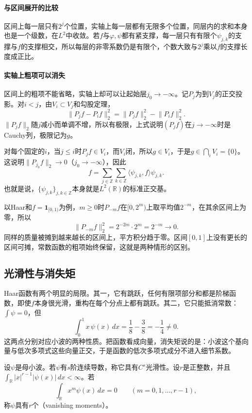 \paragraph{与区间展开的比较}
区间上每一层只有$2^j$个位置，实轴上每一层都有无限多个位置，同层内的求和本身也是一个级数，在$L^2$中收敛。若$f$与$\varphi,\psi$都有紧支撑，每一层只有有限个$\psi_{j,k}$的支撑与$f$的支撑相交，所以每层的非零系数仍是有限个，个数大致与$2^j$乘以$f$的支撑长度成正比。

\paragraph{实轴上粗项可以消失}
区间上的粗项不能省略，实轴上却可以让起始层$j_0\to-\infty$。记$P_j$为到$V_j$的正交投影。对$i<j$，由$V_i\subset V_j$和勾股定理，
\[
 \lVert P_jf-P_if\rVert_2^2=\lVert P_jf\rVert_2^2-\lVert P_if\rVert_2^2.
\]
$\lVert P_jf\rVert_2$随$j$减小而单调不增，所以有极限，上式说明$(P_jf)$在$j\to-\infty$时是Cauchy列，极限记为$g$。

对每个固定的$i$，当$j\leq i$时$P_jf\in V_i$，而$V_i$闭，所以$g\in V_i$，于是$g\in\bigcap_iV_i=\{0\}$。这说明$\lVert P_{j_0}f\rVert_2\to0$（$j_0\to-\infty$），因此
\begin{equation}
 f=\sum_{j\in\mathbb Z}\sum_{k\in\mathbb Z}\langle\psi_{j,k},f\rangle\psi_{j,k}.
 \label{eq:wavelet-only-details}
\end{equation}
也就是说，$\{\psi_{j,k}\}_{j,k\in\mathbb Z}$本身就是$L^2(\mathbb R)$的标准正交基。

以Haar和$f=\mathbf{1}_{[0,1)}$为例，$m\geq0$时$P_{-m}f$在$[0,2^m)$上取平均值$2^{-m}$，在其余区间上为零，所以
\[
 \lVert P_{-m}f\rVert_2^2=2^{-2m}\cdot2^m=2^{-m}\to0.
\]
同样的质量被摊到越来越长的区间上，平方积分趋于零。区间$[0,1]$上没有更长的区间可摊，常数函数的粗项始终保留，这就是两种情形的区别。

\subsection{光滑性与消失矩}
\label{sec:wavelet-smoothness-moments}

Haar函数有两个明显的局限。其一，它有跳跃，任何有限项部分和都是阶梯函数，即使$f$本身很光滑，重构在每个分点上都有跳跃。其二，它只能抵消常数：$\int\psi=0$，但
\[
 \int_0^1x\,\psi(x)\,dx=\frac18-\frac38=-\frac14\neq0.
\]
这两点分别对应小波的两种性质。把函数看成向量，消失矩说的是：小波这个基向量与低次多项式这些向量正交，于是函数的低次多项式成分不进入细节系数。

\begin{definition}[光滑性与消失矩]
\label{def:wavelet-vanishing-moments}
设$\psi$是母小波。若$\psi$有$s$阶连续导数，称它具有$C^s$光滑性。设$r$是正整数，并且$\int_{\mathbb R}\lvert x\rvert^{r-1}\lvert\psi(x)\rvert\,dx<\infty$。若
\begin{equation}
 \int_{\mathbb R}x^m\psi(x)\,dx=0\qquad(m=0,1,\ldots,r-1),
 \label{eq:wavelet-vanishing-moments}
\end{equation}
称$\psi$具有$r$个（vanishing moments）。
\end{definition}

